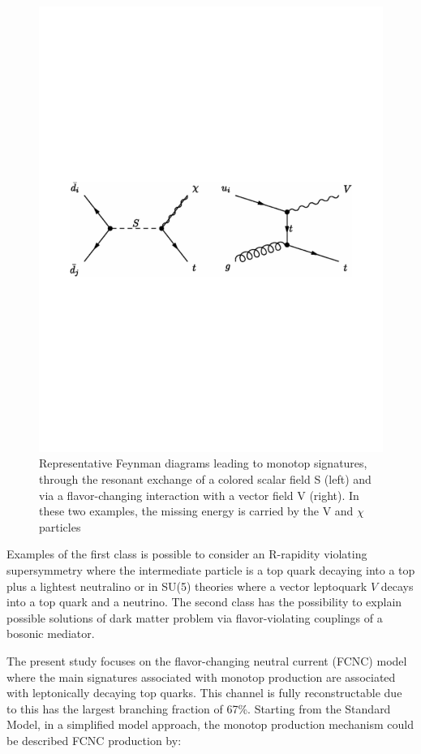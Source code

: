 \begin{figure}
\centering
\includegraphics[scale=0.60]{figures/theory_mtop.pdf}
\caption{Representative Feynman diagrams leading to monotop signatures, through the resonant exchange of a colored scalar field S (left) and via a flavor-changing interaction with a vector field V (right). In these two examples, the missing energy is carried by the V and $\chi$ particles}
\end{figure}

Examples of the first class is possible to consider an R-rapidity violating supersymmetry where the intermediate particle is a top quark decaying into a top plus a lightest neutralino or in SU(5) theories where a vector leptoquark $V$ decays into a top quark and a neutrino. The second class has the possibility to explain possible solutions of dark matter problem via flavor-violating couplings of a bosonic mediator.

The present study focuses on the flavor-changing neutral current (FCNC) model where the main signatures associated with monotop production are associated with leptonically decaying top quarks. This channel is fully reconstructable due to this has the largest branching fraction of 67\%. Starting from the Standard Model, in a simplified model approach, the monotop production mechanism could be described FCNC production by: 


